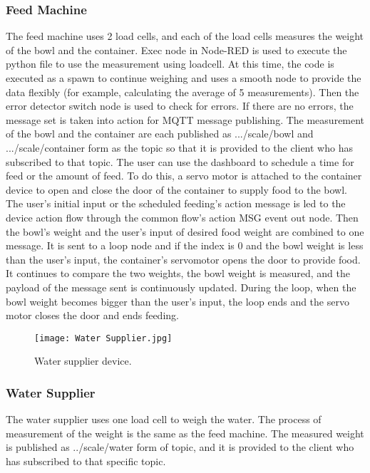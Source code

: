 \documentclass[conference]{IEEEtran}
\begin{document}
\subsubsection{Feed Machine}
The feed machine uses 2 load cells, and each of the load cells measures the weight of the bowl
and the container. Exec node in Node-RED is used to execute the python file to use the
measurement using loadcell. At this time, the code is executed as a spawn to continue weighing
and uses a smooth node to provide the data flexibly (for example, calculating the average of 5
measurements). Then the error detector switch node is used to check for errors. If there are no
errors, the message set is taken into action for MQTT message publishing. The measurement of
the bowl and the container are each published as .../scale/bowl and .../scale/container form as the
topic so that it is provided to the client who has subscribed to that topic.
The user can use the dashboard to schedule a time for feed or the amount of feed. To do this, a
servo motor is attached to the container device to open and close the door of the container to
supply food to the bowl. The user’s initial input or the scheduled feeding’s action message is led
to the device action flow through the common flow’s action MSG event out node. Then the
bowl’s weight and the user’s input of desired food weight are combined to one message. It is sent
to a loop node and if the index is 0 and the bowl weight is less than the user’s input, the
container’s servomotor opens the door to provide food. It continues to compare the two weights,
the bowl weight is measured, and the payload of the message sent is continuously updated.
During the loop, when the bowl weight becomes bigger than the user’s input, the loop ends and
the servo motor closes the door and ends feeding.

\begin{figure}[htbp]
\centerline{\texttt{[image: Water Supplier.jpg]}}
\caption{Water supplier device.}
\label{fig}
\end{figure}


\subsubsection{Water Supplier}
The water supplier uses one load cell to weigh the water. The process of measurement of the
weight is the same as the feed machine. The measured weight is published as ../scale/water form
of topic, and it is provided to the client who has subscribed to that specific topic.
\end{document}
